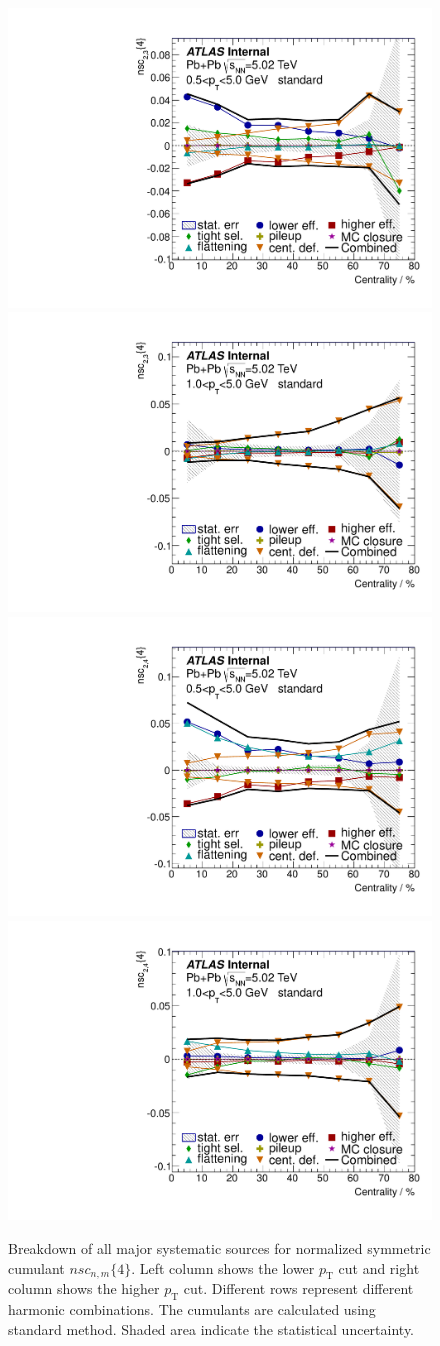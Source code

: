 \begin{figure}[H]
\centering
\includegraphics[width=.425\linewidth]{figs/sec_sys/summary/sys_nsc_1sub_Har2_Pt0.pdf}
\includegraphics[width=.425\linewidth]{figs/sec_sys/summary/sys_nsc_1sub_Har2_Pt1.pdf}
\includegraphics[width=.425\linewidth]{figs/sec_sys/summary/sys_nsc_1sub_Har3_Pt0.pdf}
\includegraphics[width=.425\linewidth]{figs/sec_sys/summary/sys_nsc_1sub_Har3_Pt1.pdf}
\caption{Breakdown of all major systematic sources for normalized symmetric cumulant $nsc_{n,m}\{4\}$. Left column shows the lower $p_\text{T}$ cut and right column shows the higher $p_\text{T}$ cut. Different rows represent different harmonic combinations. The cumulants are calculated using standard method. Shaded area indicate the statistical uncertainty.}
\label{fig:sys_sum_nsc}
\end{figure}

